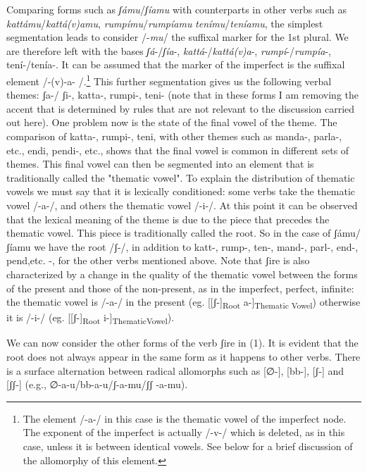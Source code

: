 \documentclass[output=paper]{langscibook}
\begin{document}
Comparing forms such as \textit{ʃámu}/\textit{ʃíamu} with counterparts in other verbs such as \textit{kattámu}/\textit{kattá(v)amu}, \textit{rumpímu}/\textit{rumpíamu} \textit{tenímu}/\textit{teníamu}, the simplest segmentation leads to consider /-\textit{mu}/ the suffixal marker for the 1st plural. We are therefore left with the bases  \textit{ʃá}-/\textit{ʃía}-, \textit{kattá}-/\textit{kattá(v)a}-, \textit{rumpí}-/\textit{rumpía}-, tení-/tenía-.  It can be assumed that the marker of the imperfect is  the suffixal element /-(v)-a- /.\footnote{The element /-a-/ in this case is the thematic vowel of the imperfect node.  The exponent of the imperfect is actually /-v-/ which is deleted, as in this case, unless it is between identical vowels.  See below for a brief discussion of the allomorphy of this element.} This further segmentation gives us the following verbal themes:  ʃa-/ ʃi-, katta-, rumpi-, teni-  (note that in these forms I am removing the accent that is determined by rules that are not relevant to the discussion carried out here). One problem now is the state of the final vowel of the theme. The comparison of  katta-, rumpi-, teni, with other themes such as  manda-, parla-, etc.,  endi, pendi-,  etc., shows that the final vowel is common in different sets of  themes.  This final vowel can then be segmented into an element that is traditionally called  the  "thematic vowel". To explain the distribution of thematic vowels we must say that it is lexically  conditioned:  some verbs take the thematic  vowel  /-a-/, and others the thematic vowel  /-i-/. At this point it can be observed that the lexical meaning of the  theme  is  due to the piece that precedes the thematic vowel. This piece is traditionally called the root. So in the case of ʃámu/ ʃíamu  we have the root /ʃ-/, in addition to  katt-, rump-, ten-, mand-, parl-, end-, pend,etc. -,  for the other verbs mentioned above.  Note that  ʃire  is also characterized by a change in the quality of the thematic vowel between the forms of the present and those of the non-present, as in the imperfect, perfect, infinite: the thematic vowel is /-a-/ in the present  (eg. [[ʃ-]\textsubscript{Root}  a-]\textsubscript{Thematic Vowel}) otherwise it is  /-i-/ (eg. [[ʃ-]\textsubscript{Root}  i-]\textsubscript{ThematicVowel}).

We can now consider the other forms of the verb ʃire  in  (1).  It is evident that the root does not always appear in the same form as it happens to other verbs.  There is a surface alternation between radical allomorphs such as  [∅-], [bb-], [ʃ-]  and  [ʃʃ-]  (e.g.,  ∅-a-u/bb-a-u/ʃ-a-mu/ʃʃ -a-mu).  
\end{document}
